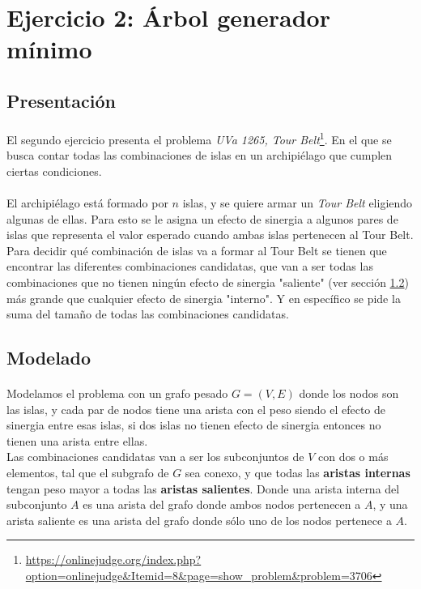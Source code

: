 \documentclass[../main.tex]{subfiles}
\begin{document}
\section{Ejercicio 2: Árbol generador mínimo}
\label{sec:ej2-intro}

\subsection{Presentación}
\paragraph{} El segundo ejercicio presenta el problema \textit{UVa 1265, Tour Belt}\footnote{\url{https://onlinejudge.org/index.php?option=onlinejudge&Itemid=8&page=show_problem&problem=3706}}. En el que se busca contar todas las combinaciones de islas en un archipiélago que cumplen ciertas condiciones. %

\paragraph{} El archipiélago está formado por \(n\) islas, y se quiere armar un \textit{Tour Belt} eligiendo algunas de ellas. Para esto se le asigna un efecto de sinergia a algunos pares de islas que representa el valor esperado cuando ambas islas pertenecen al Tour Belt. \\ %
Para decidir qué combinación de islas va a formar al Tour Belt se tienen que encontrar las diferentes combinaciones candidatas, que van a ser todas las combinaciones que no tienen ningún efecto de sinergia "saliente" (ver sección \ref{sec:ej2-model}) más grande que cualquier efecto de sinergia "interno". Y en específico se pide la suma del tamaño de todas las combinaciones candidatas. %

\subsection{Modelado}
\label{sec:ej2-model}
\paragraph{} Modelamos el problema con un grafo pesado \(G = (V, E)\) donde los nodos son las islas, y cada par de nodos tiene una arista con el peso siendo el efecto de sinergia entre esas islas, si dos islas no tienen efecto de sinergia entonces no tienen una arista entre ellas. \\
Las combinaciones candidatas van a ser los subconjuntos de \(V\) con dos o más elementos, tal que el subgrafo de \(G\) sea conexo, y que todas las \textbf{aristas internas} tengan peso mayor a todas las \textbf{aristas salientes}. Donde una arista interna del subconjunto \(A\) es una arista del grafo donde ambos nodos pertenecen a \(A\), y una arista saliente es una arista del grafo donde sólo uno de los nodos pertenece a \(A\). %
\end{document}
